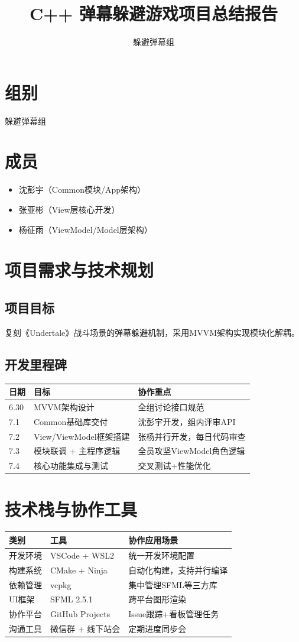 \documentclass{article}
\title{C++ 弹幕躲避游戏项目总结报告}
\author{躲避弹幕组}
\begin{document}
\maketitle

\section*{组别}
躲避弹幕组

\section*{成员}
\begin{itemize}
    \item 沈彭宇（Common模块/App架构）
    \item 张亚彬（View层核心开发）
    \item 杨征雨（ViewModel/Model层架构）
\end{itemize}

\section{项目需求与技术规划}
\subsection{项目目标}
复刻《Undertale》战斗场景的弹幕躲避机制，采用MVVM架构实现模块化解耦。

\subsection{开发里程碑}
\begin{tabular}{lll}
\toprule
日期 & 目标 & 协作重点 \\
\midrule
6.30 & MVVM架构设计 & 全组讨论接口规范 \\
7.1 & Common基础库交付 & 沈彭宇开发，组内评审API \\
7.2 & View/ViewModel框架搭建 & 张杨并行开发，每日代码审查 \\
7.3 & 模块联调 + 主程序逻辑 & 全员攻坚ViewModel角色逻辑 \\
7.4 & 核心功能集成与测试 & 交叉测试+性能优化 \\
\bottomrule
\end{tabular}

\section{技术栈与协作工具}
\begin{tabular}{lll}
\toprule
类别 & 工具 & 协作应用场景 \\
\midrule
开发环境 & VSCode + WSL2 & 统一开发环境配置 \\
构建系统 & CMake + Ninja & 自动化构建，支持并行编译 \\
依赖管理 & vcpkg & 集中管理SFML等三方库 \\
UI框架 & SFML 2.5.1 & 跨平台图形渲染 \\
协作平台 & GitHub Projects & Issue跟踪+看板管理任务 \\
沟通工具 & 微信群 + 线下站会 & 定期进度同步会 \\
\bottomrule
\end{tabular}
\end{document}
